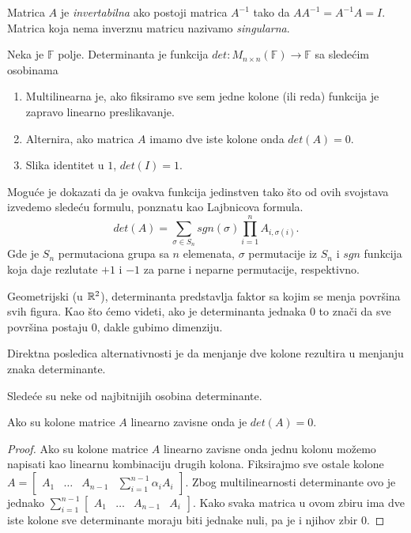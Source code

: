 \documentclass{article}
\begin{document}
\begin{definition}[Invertabilnost]
  Matrica $A$ je \textit{invertabilna} ako postoji matrica $A^{-1}$ tako da $AA^{-1} = A^{-1}A = I$.
  Matrica koja nema inverznu matricu nazivamo \textit{singularna}.
\end{definition}

\begin{definition}[Determinanta]
  Neka je $\mathbb{F}$ polje.
  Determinanta je funkcija $det : M_{n \times n} (\mathbb{F}) \to \mathbb{F}$ sa sledećim osobinama
  \begin{enumerate}
    \item Multilinearna je, ako fiksiramo sve sem jedne kolone (ili reda) funkcija je zapravo linearno preslikavanje.
    \item Alternira, ako matrica $A$ imamo dve iste kolone onda $det(A) = 0$.
    \item Slika identitet u $1$, $det(I) = 1$.
  \end{enumerate}

  Moguće je dokazati da je ovakva funkcija jedinstven tako što od ovih svojstava izvedemo sledeću formulu, ponznatu kao Lajbnicova formula.
  \[det(A) = \sum_{\sigma \in S_n} sgn(\sigma) \prod_{i = 1}^{n} A_{i, \sigma(i)}.\]
  Gde je $S_n$ permutaciona grupa sa $n$ elemenata, $\sigma$ permutacije iz $S_n$ i $sgn$ funkcija koja daje rezlutate $+1$ i $-1$ za parne i neparne permutacije, respektivno.
\end{definition}

Geometrijski (u $\mathbb{R}^2$), determinanta predstavlja faktor sa kojim se menja površina svih figura.
Kao što ćemo videti, ako je determinanta jednaka $0$ to znači da sve površina postaju $0$, dakle gubimo dimenziju.

Direktna posledica alternativnosti je da menjanje dve kolone rezultira u menjanju znaka determinante.

Sledeće su neke od najbitnijih osobina determinante.

\begin{theorem}
  Ako su kolone matrice $A$ linearno zavisne onda je $det(A) = 0$.
\end{theorem}

\begin{proof}
  Ako su kolone matrice $A$ linearno zavisne onda jednu kolonu možemo napisati kao linearnu kombinaciju drugih kolona.
  Fiksirajmo sve ostale kolone $A = \begin{bmatrix} A_1 & \ldots & A_{n - 1} & \sum_{i = 1}^{n - 1} \alpha_i A_i \end{bmatrix}$.
  Zbog multilinearnosti determinante ovo je jednako $\sum_{i = 1}^{n - 1} \begin{bmatrix} A_1 & \ldots & A_{n - 1} & A_i \end{bmatrix}$.
  Kako svaka matrica u ovom zbiru ima dve iste kolone sve determinante moraju biti jednake nuli, pa je i njihov zbir 0.
\end{proof}
\end{document}
